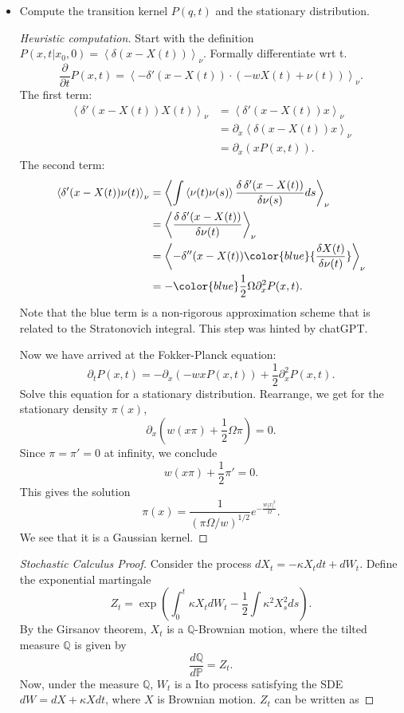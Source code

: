 \begin{itemize}
	\item Compute the transition kernel $P(q, t)$ and the stationary distribution.
		\begin{proof}[Heuristic computation]
			Start with the definition $P(x, t | x_0, 0) = \left\langle \delta(x - X(t)) \right\rangle _ \nu$. Formally differentiate wrt t.
			\[
				\frac{\partial }{\partial t} P(x, t) = \left\langle - \delta'(x - X(t)) \cdot \left( - w X(t) + \nu(t) \right)  \right\rangle _ \nu
			.\] 
			The first term:
			\begin{align*}
				\left\langle \delta'(x - X(t)) X(t) \right\rangle _ \nu
				&= \left\langle \delta'(x - X(t)) x \right\rangle _ \nu\\
				&= \partial_x \left\langle \delta(x - X(t)) x \right\rangle _ \nu  \\
				&= \partial_x \left( x P(x, t) \right)  
			.\end{align*}
			The second term:
			\begin{align*}
				\left\langle \delta'(x - X(t)) \nu(t) \right\rangle _ \nu
				&= \left\langle  \int \left\langle \nu(t) \nu(s) \right\rangle \frac{\delta \, \delta'(x - X(t))}{\delta \nu(s)} ds \right\rangle_ \nu  \\
				&= \left\langle \frac{\delta \, \delta'(x - X(t))}{\delta \nu(t)} \right\rangle _ \nu \\
				&= \left\langle - \delta''(x - X(t)) {\color{blue}{\frac{\delta X(t)}{ \delta \nu(t)}} } \right\rangle _ \nu \\
				&= - {\color{blue} \frac{1}{2}} \Omega \partial_x^2 P(x, t)
			.\end{align*}
			Note that the blue term is a non-rigorous approximation scheme that is related to the Stratonovich integral. This step was hinted by chatGPT.

			Now we have arrived at the Fokker-Planck equation:
			\[
				\boxed{
					\partial_{t} P(x, t) = - \partial_x (- w x P(x, t)) + \frac{1}{2} \partial_x^2 P(x, t)
				}
			.\] 
			Solve this equation for a stationary distribution. Rearrange, we get for the stationary density $\pi(x)$,
			\[
				\partial_x \left( w (x \pi) + \frac{1}{2} \Omega \pi \right) = 0
			.\] 
			Since $\pi = \pi' = 0$ at infinity, we conclude
			\[
				w (x \pi) + \frac{1}{2} \pi' = 0
			.\] 
			This gives the solution
			\[
				\pi(x) = \frac{1}{(\pi \Omega / w)^{1 / 2}}e^{-\frac{ w |x|^2}{\Omega}}
			.\] 
			We see that it is a Gaussian kernel.
		\end{proof}

		\begin{proof}[Stochastic Calculus Proof]
			Consider the process $d X_t = - \kappa X_t d t + d W_t$. Define the exponential martingale
			\[
				Z_t = \exp \left( \int _0^t \kappa X_t d W_t - \frac{1}{2} \int \kappa^2 X_s^2 ds \right) 
			.\] 
			By the Girsanov theorem, $X_t$ is a $\mathbb{Q}$-Brownian motion, where the tilted measure $\mathbb{Q}$ is given by
			\[
				\frac{d \mathbb{Q}}{d \mathbb{P}}
				= Z_t
			.\] 
			Now, under the measure  $ \mathbb{Q}$, $W_t$ is a Ito process satisfying the SDE $dW = dX + \kappa X dt$, where $X$ is Brownian motion. $Z_t$ can be written as


\end{proof}
\end{itemize}
